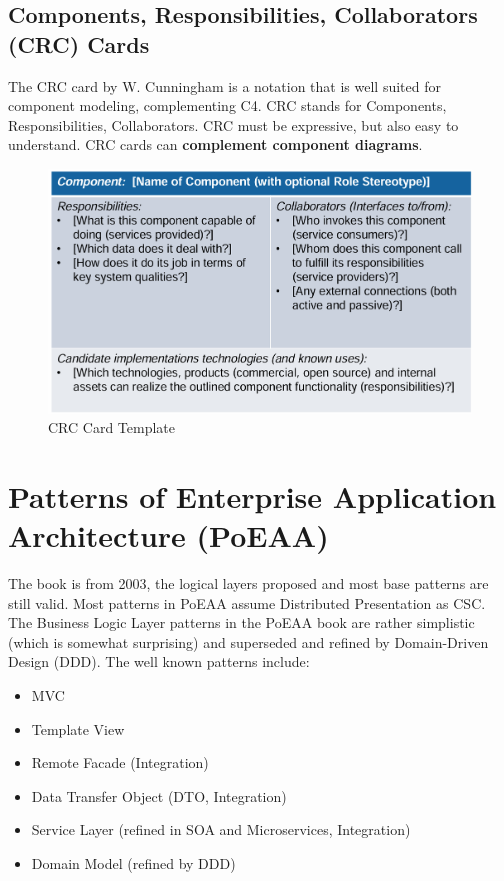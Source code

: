 \documentclass[../Main.tex]{subfiles}
\begin{document}
\subsection{Components, Responsibilities, Collaborators (CRC) Cards}
The CRC card by W. Cunningham is a notation that is well suited for component modeling, 
complementing C4. CRC stands for Components, Responsibilities, Collaborators.
CRC must be expressive, but also easy to understand.
CRC cards can \textbf{complement component diagrams}.

\begin{figure}[H]
    \centering
    \includegraphics[width=1\linewidth]{Images/crc-card.png}
    \caption{CRC Card Template}
\end{figure}
\newpage

\section{Patterns of Enterprise Application Architecture (PoEAA)}

The book is from 2003, the logical layers proposed and most base patterns are still valid.
Most patterns in PoEAA assume Distributed Presentation as CSC.
The Business Logic Layer patterns in the PoEAA book are rather simplistic (which is somewhat surprising) and
superseded and refined by Domain-Driven Design (DDD).
The well known patterns include:
\begin{itemize}
    \item MVC
    \item Template View
    \item Remote Facade (Integration)
    \item Data Transfer Object (DTO, Integration)
    \item Service Layer (refined in SOA and Microservices, Integration)
    \item Domain Model (refined by DDD)
\end{itemize}
\end{document}
